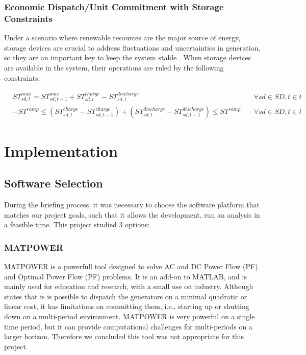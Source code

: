 \documentclass[12pt,LUDisStyle,twosided]{book}
\begin{document}
\subsubsection{Economic Dispatch/Unit Commitment with Storage Constraints}

Under a scenario where renewable resources are the major source of energy, storage devices are crucial to address fluctuations and uncertainties in generation, so they are an important key to keep the system stable \cite{dwyer}. When storage devices are available in the system, their operations are ruled by the following constraints:

\begin{subequations}\label{model:storageConstraints}
\begin{alignat}{4}
& ST^{max}_{sd,t} = ST^{max}_{sd,t - 1} + ST^{charge}_{sd,t} - ST^{discharge}_{sd,t}  &~& \forall sd \in SD, t \in t \label{eq:storageLimits} \\
&  -ST^{ramp} \leq (ST^{charge}_{sd,t} - ST^{charge}_{sd,t-1}) + (ST^{discharge}_{sd,t} - ST^{discharge}_{sd,t-1}) \leq ST^{ramp}  &~& \forall sd \in SD, t \in t \label{eq:storageRamping}
\end{alignat} 
\end{subequations}


\section{Implementation}


\subsection{Software Selection}

During the briefing process, it was necessary to choose the software platform that matches our project goals, such that it allows the development, run an analysis in a feasible time. This project studied 3 options:

\subsubsection{MATPOWER}

MATPOWER is a powerfull tool designed to solve AC and DC Power Flow (PF) and Optimal Power Flow (PF) problems. It is an add-on to MATLAB, and is mainly used for education and research, with a small use on industry. \cite{zimmerman} Although \citeauthor{zimmerman} states that is is possible to dispatch the generators on a minimal quadratic or linear cost, it has limitations on committing them, i.e., starting up or shutting down on a multi-period environment. MATPOWER is very powerful on a single time period, but it can provide computational challenges for multi-periods on a larger horizon. Therefore we concluded this tool was not appropriate for this project.
\end{document}

